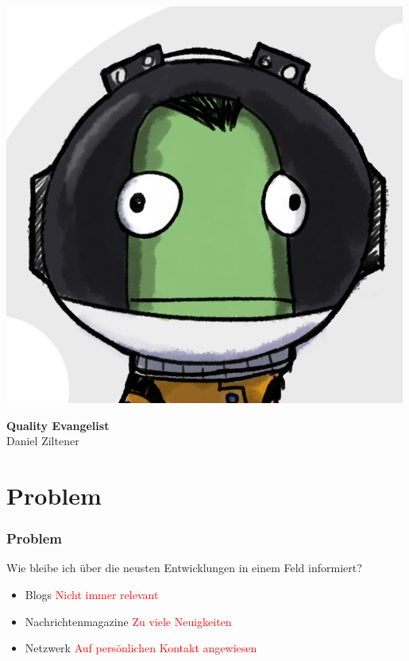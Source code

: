 \documentclass{beamer}
\begin{document}
\begin{frame}
\begin{minipage}{.2\textwidth}
    \includegraphics[height=.2\textheight]{balz}
  \end{minipage}%
  \hfill
  \begin{minipage}{.8\textwidth}
    \textbf{Quality Evangelist} \\ Daniel Ziltener \\    
  \end{minipage}
\end{frame}

\section{Problem}
\begin{frame}
  \frametitle{Problem}
  Wie bleibe ich über die neusten Entwicklungen in einem Feld informiert? \pause
    \begin{itemize}
       \item Blogs \pause \textcolor{red}{Nicht immer relevant} \pause
       \item Nachrichtenmagazine \pause \textcolor{red}{Zu viele Neuigkeiten} \pause
       \item Netzwerk \pause \textcolor{red}{Auf persönlichen Kontakt angewiesen}
    \end{itemize}       
\end{frame}  
\end{document}

